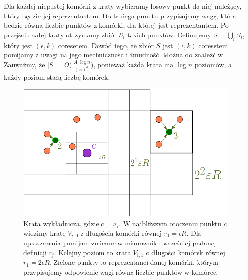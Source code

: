 Dla każdej niepustej komórki z kraty wybieramy losowy punkt do niej należący, który będzie jej reprezentantem.
Do takiego punktu przypisujemy wagę, która bedzie równa liczbie punktów z komórki, dla której jest reprezentantem.
Po przejściu całej kraty otrzymamy zbiór $S_{i}$ takich punktów.
Definujemy $S = \bigcup_{i} S_{i}$, który jest  $(\epsilon, k)$ coresetem.
Dowód tego, że zbiór $S$ jest $(\epsilon, k)$ coresetem pomijamy z uwagi na jego mechniczność i żmudność.
Można do znaleźć w \cite{10.1145/1007352.1007400}.
Zauważmy, że $|S| = O\Big( \frac{|A| \log n }{ (c\epsilon)^{d} } \Big)$, ponieważ każda krata ma $\log n$ poziomów, a każdy poziom stałą liczbę komórek.
\begin{figure}[H]
    \centering
    \includegraphics[totalheight=4cm]{grid.png}
    \caption{Krata wykładnicza, gdzie $c = x_{i}$. W najbliższym otoczeniu punktu $c$ widzimy kratę $V_{i,0}$ z długością komórki równej $r_{0} = \epsilon R$.
    Dla uproszczenia pomijam zmienne w mianowniku wcześniej podanej definicji $r_{j}$.
    Kolejny poziom to krata $V_{i,1}$ o długości komórek równej $r_{1} = 2 \epsilon R$.
    Zielone punkty to reprezentanci danej komórki, którym przypisujemy odpowienie wagi równe liczbie punktów w komórce. 
    }
\end{figure}
